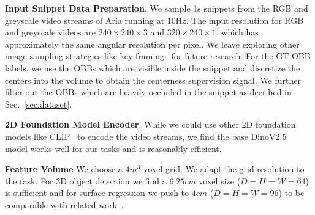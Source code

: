 \noindent\textbf{Input Snippet Data Preparation}. We sample 1s snippets from the RGB and greyscale video streams of Aria running at 10Hz.
The input resolution for RGB and greyscale videos are $240\times 240\times3$ and $320\times240\times1$, which has approximately the same angular resolution per pixel.
We leave exploring other image sampling strategies like key-framing~\cite{Xie_2023_ICCV} for future research.
For the GT OBB labels, we use the OBBs which are visible inside the snippet and discretize the centers into the volume to obtain the centerness supervision signal. We further filter out the OBBs which are heavily occluded in the snippet as decribed in Sec.~\ref{sec:dataset}.

\noindent\textbf{2D Foundation Model Encoder}. While we could use other 2D foundation models like CLIP~\cite{radford2021learning} to encode the video streams, we find the base DinoV2.5~\cite{oquab2023dinov2,darcet2023vitneedreg} model works well for our tasks and is reasonably efficient. 

\noindent\textbf{Feature Volume} We choose a $4m^3$ voxel grid. We adapt the grid resolution to the task. For 3D object detection we find a $6.25cm$ voxel size ($D=H=W=64$) is sufficient and for surface regression we push to $4cm$ ($D=H=W=96$) to be comparable with related work~\cite{sun2021neucon}. 

